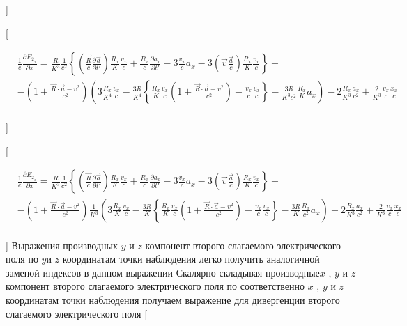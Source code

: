 \documentclass[11pt]{article}
\begin{document}
{]}

{[}

\begin{align}
  & \frac{1}{e}\frac{\partial {{E}_{2}}_{_{x}}}{\partial x}=\frac{R}{{{K}^{3}}}\frac{1}{{{c}^{2}}}\left\{ \left( \frac{\overrightarrow{R}}{c}\frac{\partial \overrightarrow{a}}{\partial t'} \right)\frac{{{R}_{x}}}{K}\frac{{{v}_{x}}}{c}+\frac{{{R}_{x}}}{c}\frac{\partial {{a}_{x}}}{\partial t'}-3\frac{{{v}_{x}}}{c}{{a}_{x}}-3\left( \overrightarrow{v}\frac{\overrightarrow{a}}{c} \right)\frac{{{R}_{x}}}{K}\frac{{{v}_{x}}}{c} \right\}- \\ 
 & -\left( 1+\frac{\overrightarrow{R}\cdot \overrightarrow{a}-{{v}^{2}}}{{{c}^{2}}} \right)\left( 3\frac{{{R}_{x}}}{{{K}^{4}}}\frac{{{v}_{x}}}{c}-\frac{3R}{{{K}^{4}}}\left\{ \frac{{{R}_{x}}}{K}\frac{{{v}_{x}}}{c}\left( 1+\frac{\overrightarrow{R}\cdot \overrightarrow{a}-{{v}^{2}}}{{{c}^{2}}} \right)-\frac{{{v}_{x}}}{c}\frac{{{v}_{x}}}{c} \right\}-\frac{3R}{{{K}^{3}}{{c}^{2}}}\frac{{{R}_{x}}}{K}{{a}_{x}} \right)-2\frac{{{R}_{x}}}{{{K}^{3}}}\frac{{{a}_{x}}}{{{c}^{2}}}+\frac{2}{{{K}^{3}}}\frac{{{v}_{x}}}{c}\frac{{{x}_{x}}}{c} \\ 
\end{align}

{]}

{[}

\begin{align}
  & \frac{1}{e}\frac{\partial {{E}_{2}}_{_{x}}}{\partial x}=\frac{R}{{{K}^{3}}}\frac{1}{{{c}^{2}}}\left\{ \left( \frac{\overrightarrow{R}}{c}\frac{\partial \overrightarrow{a}}{\partial t'} \right)\frac{{{R}_{x}}}{K}\frac{{{v}_{x}}}{c}+\frac{{{R}_{x}}}{c}\frac{\partial {{a}_{x}}}{\partial t'}-3\frac{{{v}_{x}}}{c}{{a}_{x}}-3\left( \overrightarrow{v}\frac{\overrightarrow{a}}{c} \right)\frac{{{R}_{x}}}{K}\frac{{{v}_{x}}}{c} \right\}- \\ 
 & -\left( 1+\frac{\overrightarrow{R}\cdot \overrightarrow{a}-{{v}^{2}}}{{{c}^{2}}} \right)\frac{1}{{{K}^{3}}}\left( 3\frac{{{R}_{x}}}{K}\frac{{{v}_{x}}}{c}-\frac{3R}{K}\left\{ \frac{{{R}_{x}}}{K}\frac{{{v}_{x}}}{c}\left( 1+\frac{\overrightarrow{R}\cdot \overrightarrow{a}-{{v}^{2}}}{{{c}^{2}}} \right)-\frac{{{v}_{x}}}{c}\frac{{{v}_{x}}}{c} \right\}-\frac{3R}{K}\frac{{{R}_{x}}}{{{c}^{2}}}{{a}_{x}} \right)-2\frac{{{R}_{x}}}{{{K}^{3}}}\frac{{{a}_{x}}}{{{c}^{2}}}+\frac{2}{{{K}^{3}}}\frac{{{v}_{x}}}{c}\frac{{{x}_{x}}}{c} \\ 
\end{align}

{]} Выражения производных \(y\) и \(z\) компонент второго слагаемого
электрического поля по \(y\)и \(z\) координатам точки наблюдения легко
получить аналогичной заменой индексов в данном выражении Скалярно
складывая производные\(x\) , \(y\) и \(z\)компонент второго слагаемого
электрического поля по соответственно \(x\) , \(y\) и \(z\)координатам
точки наблюдения получаем выражение для дивергенции второго слагаемого
электрического поля {[}
\end{document}
